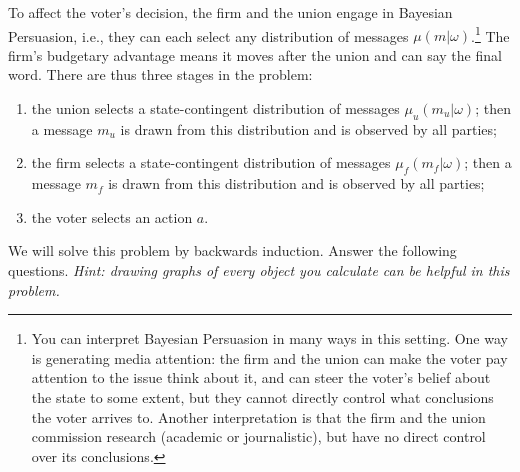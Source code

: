 \documentclass[a4paper]{article}
\begin{document}
To affect the voter's decision, the firm and the union engage in Bayesian Persuasion, i.e., they can each select any distribution of messages $\mu(m|\omega)$.\footnote{You can interpret Bayesian Persuasion in many ways in this setting. One way is generating media attention: the firm and the union can make the voter pay attention to the issue think about it, and can steer the voter's belief about the state to some extent, but they cannot directly control what conclusions the voter arrives to. Another interpretation is that the firm and the union commission research (academic or journalistic), but have no direct control over its conclusions.}
The firm's budgetary advantage means it moves after the union and can say the final word. There are thus three stages in the problem:
\begin{enumerate}[label=(\roman{enumi})]
	\item the union selects a state-contingent distribution of messages $\mu_u(m_u|\omega)$; then a message $m_u$ is drawn from this distribution and is observed by all parties;
	\item the firm selects a state-contingent distribution of messages $\mu_f(m_f|\omega)$; then a message $m_f$ is drawn from this distribution and is observed by all parties;
	\item the voter selects an action $a$.
\end{enumerate}
We will solve this problem by backwards induction. Answer the following questions.
\emph{Hint: drawing graphs of every object you calculate can be helpful in this problem.}
\end{document}
